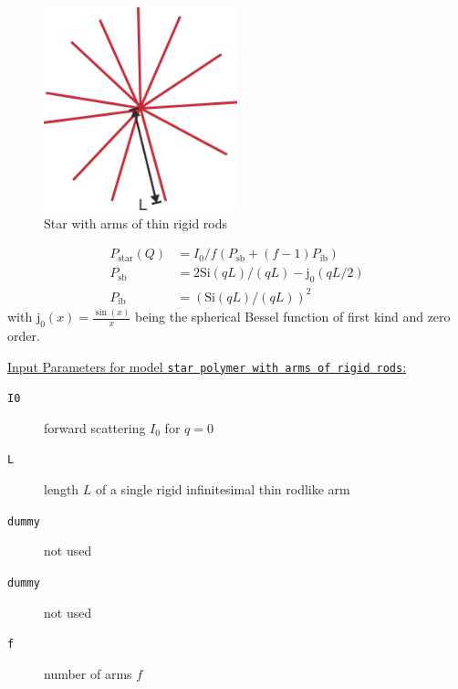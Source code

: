 \begin{figure}[htb]
\begin{center}
\includegraphics[width=0.5\textwidth]{broken_rods_star.png}
\end{center}
\caption{Star with arms of thin rigid rods} \label{fig:broken_rods_star}
\end{figure}

\begin{align}
 P_\mathrm{star}(Q) &= I_0/f\left(P_\mathrm{sb} + (f-1)P_\mathrm{ib} \right) \\
 P_\mathrm{sb} &= 2 \mathrm{Si}(qL)/(qL)-\mathrm{j}_0(qL/2) \\
 P_\mathrm{ib} &= \left( \mathrm{Si}(qL)/(qL)\right)^2
\end{align}
with $\mathrm{j}_0(x)=\frac{\sin(x)}{x}$ being the spherical Bessel function of first kind and zero order.

\vspace{5mm}

\noindent
\underline{Input Parameters for model \texttt{star polymer with arms of rigid rods}:}
\begin{description}
\item[\texttt{I0}] forward scattering $I_0$ for $q=0$
\item[\texttt{L}]length $L$ of a single rigid infinitesimal thin rodlike arm
\item[\texttt{dummy}] not used
\item[\texttt{dummy}] not used
\item[\texttt{f}] number of arms $f$
\end{description}

